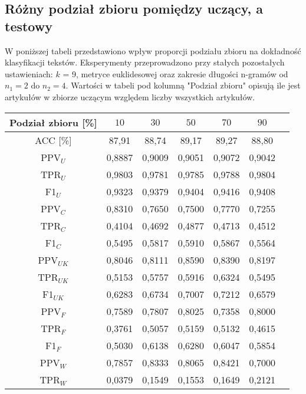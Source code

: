 \documentclass{article}
\begin{document}
\subsection{Różny podział zbioru pomiędzy uczący, a testowy}
W poniższej tabeli przedstawiono wpływ proporcji podziału zbioru na dokładność klasyfikacji tekstów. Eksperymenty przeprowadzono przy stałych pozostałych ustawieniach: \(k\) = 9, metryce euklidesowej oraz zakresie długości n-gramów od \(n_1 = 2\) do \(n_2 = 4\). Wartości w tabeli pod kolumną "Podział zbioru" opisują ile jest artykułów w zbiorze uczącym względem liczby wszystkich artykułów.

\begin{table}[H]
    \centering
    \begin{tabular}{|c|c|c|c|c|c|c}
    \hline
    \textbf{Podział zbioru [\%]} & \textbf{\(10\)} & \textbf{\(30\)} & \textbf{\(50\)} & \textbf{\(70\)}  & \textbf{\(90\)} \\ \hline
    ACC [\%] & 87,91 & 88,74 & 89,17 & 89,27 & 88,80\\ \hline
    PPV\(_U\) & 0,8887 & 0,9009 & 0,9051 & 0,9072 & 0,9042\\ \hline
    TPR\(_U\) & 0,9803 & 0,9781 & 0,9785 & 0,9788 & 0,9804\\ \hline
    F1\(_U\) & 0,9323 & 0,9379 & 0,9404 & 0,9416 & 0,9408\\ \hline
    PPV\(_C\) & 0,8310 & 0,7650 & 0,7500 & 0,7770 & 0,7255\\ \hline
    TPR\(_C\) & 0,4104 & 0,4692 & 0,4877 & 0,4713 & 0,4512\\ \hline
    F1\(_C\) & 0,5495 & 0,5817 & 0,5910 & 0,5867 & 0,5564\\ \hline
    PPV\(_{UK}\) & 0,8046 & 0,8111 & 0,8590& 0,8390 & 0,8197\\ \hline
    TPR\(_{UK}\) & 0,5153 & 0,5757 & 0,5916 & 0,6324 & 0,5495\\ \hline
    F1\(_{UK}\) & 0,6283 & 0,6734 & 0,7007 & 0,7212 & 0,6579\\ \hline
    PPV\(_F\) & 0,7589 & 0,7807 & 0,8025 & 0,7358 & 0,8000\\ \hline
    TPR\(_F\) & 0,3761 & 0,5057 & 0,5159 & 0,5132 & 0,4615\\ \hline
    F1\(_F\) & 0,5030 & 0,6138 & 0,6280 & 0,6047 & 0,5854\\ \hline
    PPV\(_W\) & 0,7857 & 0,8333 & 0,8065 & 0,8421 & 0,7000\\ \hline
    TPR\(_W\) & 0,0379 & 0,1549 & 0,1553 & 0,1649 & 0,2121\\ \hline

\end{tabular}
\end{table}
\end{document}
